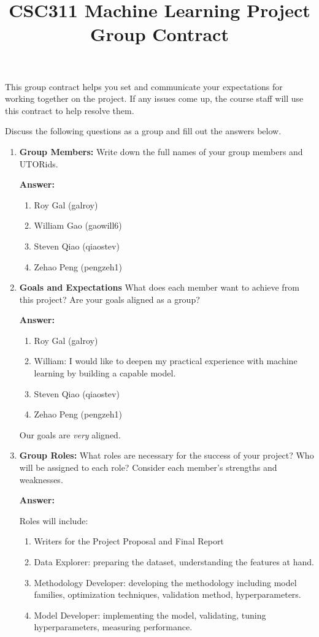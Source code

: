 \documentclass[12pt]{article}
\title{CSC311 Machine Learning Project Group Contract}
\author{}
\date{}
\newenvironment{answer}[1][]{
  \color{blue}\textbf{Answer:}
}{}
\begin{document}
\maketitle

This group contract helps you set and communicate your expectations for working together on the project. If any issues come up, the course staff will use this contract to help resolve them.

Discuss the following questions as a group and fill out the answers below.

\begin{enumerate}
\item {\bf Group Members:} Write down the full names of your group members and UTORids.

\begin{answer}
\begin{enumerate}
  \item Roy Gal (galroy)
  \item William Gao (gaowill6)
  \item Steven Qiao (qiaostev)
  \item Zehao Peng (pengzeh1)
\end{enumerate}
\end{answer}

\item {\bf Goals and Expectations} What does each member want to achieve from this project? Are your goals aligned as a group?

\begin{answer}
\begin{enumerate}
  \item Roy Gal (galroy)
  \item William: I would like to deepen my practical experience with machine learning by building a capable model.
  \item Steven Qiao (qiaostev)
  \item Zehao Peng (pengzeh1)
\end{enumerate}
Our goals are \emph{very} aligned.
\end{answer}

\item {\bf Group Roles:} What roles are necessary for the success of your project? Who will be assigned to each role? Consider each member’s strengths and weaknesses.

\begin{answer}

Roles will include:
\begin{enumerate}
  \item Writers for the Project Proposal and Final Report
  \item Data Explorer: preparing the dataset, understanding the features at hand.
  \item Methodology Developer: developing the methodology including model families, optimization techniques, validation method, hyperparameters.
  \item Model Developer: implementing the model, validating, tuning hyperparameters, measuring performance.
\end{enumerate}


\end{answer}
\end{enumerate}
\end{document}
